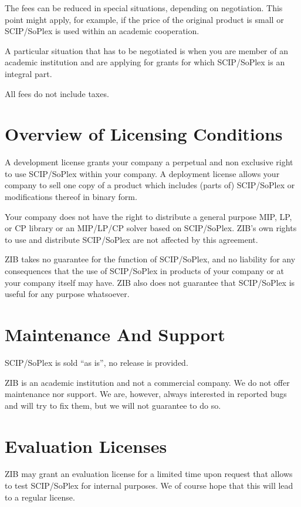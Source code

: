\documentclass[12pt,a4paper]{article}
\begin{document}
The fees can be reduced in special situations, depending on negotiation.
This point might apply, for example, if the price of the original product
is small or SCIP/SoPlex is used within an academic cooperation.

A particular situation that has to be negotiated is when you are member of
an academic institution and are applying for grants for which SCIP/SoPlex
is an integral part.

All fees do not include taxes.


\section{Overview of Licensing Conditions}

A development license grants your company a perpetual and non exclusive
right to use SCIP/SoPlex within your company.  A deployment license allows
your company to sell one copy of a product which includes (parts of)
SCIP/SoPlex or modifications thereof in binary form.

Your company does not have the right to distribute a general purpose MIP,
LP, or CP library or an MIP/LP/CP solver based on SCIP/SoPlex. ZIB's own
rights to use and distribute SCIP/SoPlex are not affected by this
agreement.

ZIB takes no guarantee for the function of SCIP/SoPlex, and no liability
for any consequences that the use of SCIP/SoPlex in products of your
company or at your company itself may have.  ZIB also does not guarantee
that SCIP/SoPlex is useful for any purpose whatsoever.


\section{Maintenance And Support}

SCIP/SoPlex is sold ``as is'', no release is provided.

ZIB is an academic institution and not a commercial company. We do not
offer maintenance nor support. We are, however, always interested in
reported bugs and will try to fix them, but we will not guarantee to do so.


\section{Evaluation Licenses}

ZIB may grant an evaluation license for a limited time upon request that
allows to test SCIP/SoPlex for internal purposes. We of course hope that
this will lead to a regular license.
\end{document}
